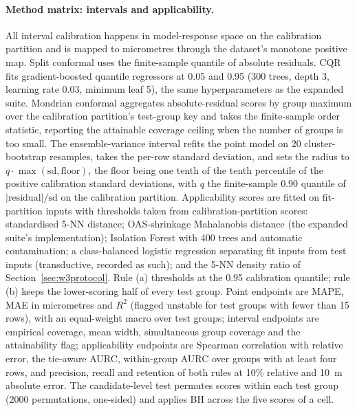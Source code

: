 \documentclass[11pt,a4paper]{article}
\newcommand{\um}{\textmu m}
\begin{document}
\paragraph{Method matrix: intervals and applicability.} All interval
calibration happens in model-response space on the calibration partition and
is mapped to micrometres through the dataset's monotone positive map. Split
conformal uses the finite-sample quantile of absolute residuals. CQR fits
gradient-boosted quantile regressors at 0.05 and 0.95 (300 trees, depth 3,
learning rate 0.03, minimum leaf 5), the same hyperparameters as the expanded
suite. Mondrian conformal aggregates absolute-residual scores by group
maximum over the calibration partition's test-group key and takes the
finite-sample order statistic, reporting the attainable coverage ceiling when
the number of groups is too small. The ensemble-variance interval refits the
point model on 20 cluster-bootstrap resamples, takes the per-row standard
deviation, and sets the radius to $q\cdot\max(\mathrm{sd},\mathrm{floor})$, the floor being one
tenth of the tenth percentile of the positive calibration standard deviations,
with $q$ the finite-sample 0.90 quantile of $|\mathrm{residual}|/\mathrm{sd}$
on the calibration partition. Applicability scores are fitted on
fit-partition inputs with thresholds taken from calibration-partition scores:
standardised 5-NN distance; OAS-shrinkage Mahalanobis distance (the expanded
suite's implementation); Isolation Forest with 400 trees and automatic
contamination; a class-balanced logistic regression separating fit inputs
from test inputs (transductive, recorded as such); and the 5-NN density ratio
of Section~\ref{sec:w3protocol}. Rule (a) thresholds at the 0.95 calibration
quantile; rule (b) keeps the lower-scoring half of every test group. Point
endpoints are MAPE, MAE in micrometres and $R^2$ (flagged unstable for test
groups with fewer than 15 rows), with an equal-weight macro over test groups;
interval endpoints are empirical coverage, mean width, simultaneous group
coverage and the attainability flag; applicability endpoints are Spearman
correlation with relative error, the tie-aware AURC, within-group AURC over
groups with at least four rows, and precision, recall and retention of both
rules at 10\% relative and 10~\um{} absolute error. The candidate-level test
permutes scores within each test group (2000 permutations, one-sided) and
applies BH across the five scores of a cell.
\end{document}
